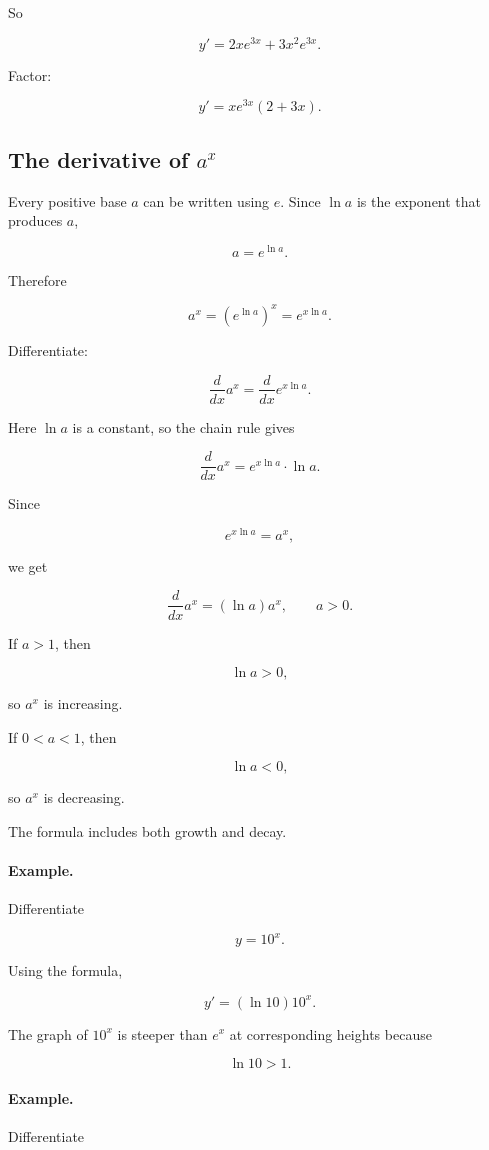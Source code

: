 So

\[
y'=2xe^{3x}+3x^2e^{3x}.
\]

Factor:

\[
\boxed{
y'=xe^{3x}(2+3x).
}
\]

\subsection{The derivative of \texorpdfstring{\(a^x\)}{a to x}}
\label{subsec:derivative-a-to-x}

Every positive base \(a\) can be written using \(e\).  Since \(\ln a\) is the exponent that produces \(a\),

\[
a=e^{\ln a}.
\]

Therefore

\[
a^x=\left(e^{\ln a}\right)^x=e^{x\ln a}.
\]

Differentiate:

\[
\frac{d}{dx}a^x
=
\frac{d}{dx}e^{x\ln a}.
\]

Here \(\ln a\) is a constant, so the chain rule gives

\[
\frac{d}{dx}a^x
=
e^{x\ln a}\cdot\ln a.
\]

Since

\[
e^{x\ln a}=a^x,
\]

we get

\[
\boxed{
\frac{d}{dx}a^x=(\ln a)a^x,
\qquad a>0.
}
\]

If \(a>1\), then

\[
\ln a>0,
\]

so \(a^x\) is increasing.

If \(0<a<1\), then

\[
\ln a<0,
\]

so \(a^x\) is decreasing.

The formula includes both growth and decay.

\paragraph{Example.}
Differentiate

\[
y=10^x.
\]

Using the formula,

\[
\boxed{
y'=(\ln 10)10^x.
}
\]

The graph of \(10^x\) is steeper than \(e^x\) at corresponding heights because

\[
\ln 10>1.
\]

\paragraph{Example.}
Differentiate

